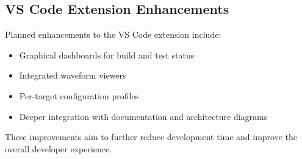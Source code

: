 \subsection{VS Code Extension Enhancements}

Planned enhancements to the VS Code extension include:
\begin{itemize}
    \item Graphical dashboards for build and test status
    \item Integrated waveform viewers
    \item Per-target configuration profiles
    \item Deeper integration with documentation and architecture diagrams
\end{itemize}

These improvements aim to further reduce development time and improve the overall developer experience.
